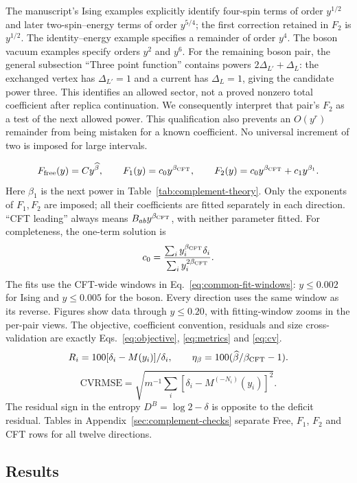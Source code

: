 The manuscript's Ising examples explicitly identify four-spin terms
of order $y^{1/2}$ and later two-spin--energy terms of order $y^{5/4}$;
the first correction retained in $F_2$ is $y^{1/2}$. The identity--energy
example specifies a remainder of order $y^4$. The boson vacuum examples
specify orders $y^2$ and $y^6$. For the remaining boson pair, the general
subsection ``Three point function'' contains powers
$2\Delta_{L'}+\Delta_L$: the exchanged vertex has $\Delta_{L'}=1$
and a current has $\Delta_L=1$, giving the candidate power three.
This identifies an allowed sector, not a proved nonzero total
coefficient after replica continuation. We consequently interpret
that pair's $F_2$ as a test of the next allowed power. This qualification
also prevents an $O(y^r)$ remainder from being mistaken for a known
coefficient. No universal increment of two is imposed for large intervals.

\begin{equation}
 F_{\rm free}(y)=Cy^{\widehat\beta},\qquad
 F_1(y)=c_0y^{\beta_{\rm CFT}},\qquad
 F_2(y)=c_0y^{\beta_{\rm CFT}}+c_1y^{\beta_1}.
 \label{eq:complement-fit}
\end{equation}
Here $\beta_1$ is the next power in Table~\ref{tab:complement-theory}.
Only the exponents of $F_1,F_2$ are imposed; all their coefficients
are fitted separately in each direction. ``CFT leading'' always means
$B_{ab}y^{\beta_{\rm CFT}}$, with neither parameter fitted.
For completeness, the one-term solution is
\begin{equation}
 c_0=\frac{\sum_i y_i^{\beta_{\rm CFT}}\delta_i}
                 {\sum_i y_i^{2\beta_{\rm CFT}}}.
 \label{eq:complement-fixed-fit}
\end{equation}
The fits use the CFT-wide windows in Eq.~\eqref{eq:common-fit-windows}:
$y\leq0.002$ for Ising and $y\leq0.005$ for the boson. Every
direction uses the same window as its reverse. Figures show data
through $y\leq0.20$, with fitting-window zooms in the per-pair views.
The objective, coefficient convention, residuals and size cross-validation
are exactly Eqs.~\eqref{eq:objective}, \eqref{eq:metrics} and \eqref{eq:cv}.
\begin{equation}
 R_i=100[\delta_i-M(y_i)]/\delta_i,\qquad
 \eta_\beta=100(\widehat\beta/\beta_{\rm CFT}-1).
 \label{eq:complement-fit-metrics}
\end{equation}
\begin{equation}
 \mathrm{CVRMSE}=\sqrt{m^{-1}\sum_i[\delta_i-M^{(-N_i)}(y_i)]^2}.
 \label{eq:complement-cv}
\end{equation}
The residual sign in the entropy $D^B=\log2-\delta$ is opposite to
the deficit residual. Tables in Appendix~\ref{sec:complement-checks}
separate Free, $F_1$, $F_2$ and CFT rows for all twelve directions.
\subsection{Results}
\label{sec:complement-results}


